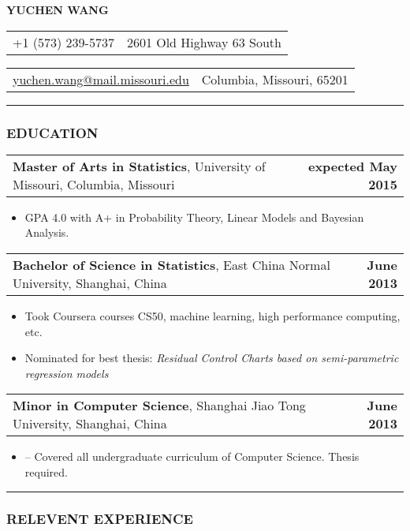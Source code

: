 \documentclass[11pt]{article}
\makeatletter
\newcommand{\headerrow}[2]
{\begin{tabular*}{\linewidth}{l@{\extracolsep{\fill}}r}
	#1 & #2 \\
\end{tabular*}
}
\makeatother
\begin{document}
\begin{center}
	\huge\textbf{YUCHEN WANG}
\end{center}

\noindent\headerrow{+1 (573) 239-5737}{2601 Old Highway 63 South}
\headerrow
{\href{mailto:yuchen.wang@mail.missouri.edu}{yuchen.wang@mail.missouri.edu}}
{Columbia, Missouri, 65201}

\vspace{-.8em}
\hrule


\subsubsection*{\centering EDUCATION}
\vspace{-.4em}

\headerrow
	{\textbf{Master of Arts in Statistics}, University of Missouri, Columbia, Missouri}
	{\textbf{expected May 2015}}
	\begin{itemize}
		\item GPA 4.0 with A+ in Probability Theory, Linear Models and Bayesian Analysis.
	\end{itemize}

\noindent\headerrow
	{\textbf{Bachelor of Science in Statistics}, East China Normal University, Shanghai, China}
	{\textbf{June 2013}}
	\begin{itemize}
		\item Took Coursera courses CS50, machine learning, high performance computing, etc.
		\item Nominated for best thesis: \textit{Residual Control Charts based on semi-parametric regression models}
	\end{itemize}

\noindent\headerrow
	{\textbf{Minor in Computer Science}, Shanghai Jiao Tong University, Shanghai, China}
	{\textbf{June 2013}}
	\begin{itemize}
		\item -- Covered all undergraduate curriculum of Computer Science. Thesis required.
	\end{itemize}

\vspace{0.2em}
\hrule


\subsubsection*{\centering RELEVENT EXPERIENCE}
\vspace{-.4em}
\end{document}
